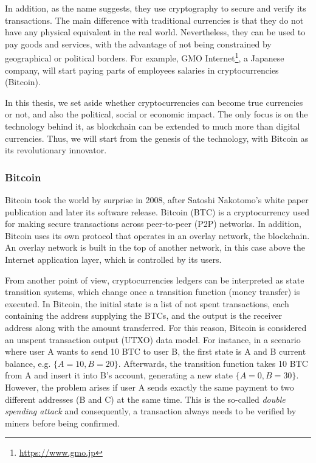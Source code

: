 In addition, as the name suggests, they use cryptography to secure and verify its transactions. The main difference with traditional currencies is that they do not have any physical equivalent in the real world. Nevertheless, they can be used to pay goods and services, with the advantage of not being constrained by geographical or political borders. For example, GMO Internet\footnote{\url{https://www.gmo.jp}}, a Japanese company, will start paying parts of employees salaries in cryptocurrencies (Bitcoin).

In this thesis, we set aside whether cryptocurrencies can become true currencies or not, and also the political, social or economic impact. The only focus is on the technology behind it, as blockchain can be extended to much more than digital currencies. Thus, we will start from the genesis of the technology, with Bitcoin as its revolutionary innovator.


\subsubsection{Bitcoin}

Bitcoin took the world by surprise in 2008, after Satoshi Nakotomo's white paper publication \cite{nakamoto2008bitcoin} and later its software release. Bitcoin (BTC) is a cryptocurrency used for making secure transactions across peer-to-peer (P2P) networks. In addition, Bitcoin uses its own protocol that operates in an overlay network, the blockchain. An overlay network is built in the top of another network, in this case above the Internet application layer, which is controlled by its users.

From another point of view, cryptocurrencies ledgers can be interpreted as state transition systems, which change once a transition function (money transfer) is executed. In Bitcoin, the initial state is a list of not spent transactions, each containing the address supplying the BTCs, and the output is the receiver address along with the amount transferred. For this reason, Bitcoin is considered an unspent transaction output (UTXO) data model. For instance, in a scenario where user A wants to send 10 BTC to user B, the first state is A and B current balance, e.g. $\{A = 10, B = 20\}$. Afterwards, the transition function takes 10 BTC from A and insert it into B's account, generating a new state $\{A = 0, B = 30\}$. However, the problem arises if user A sends exactly the same payment to two different addresses (B and C) at the same time. This is the so-called \textit{double spending attack} and consequently, a transaction always needs to be verified by miners before being confirmed. 

